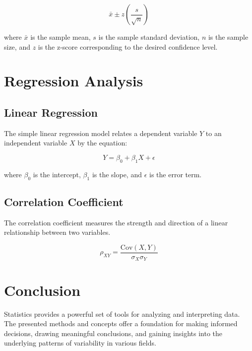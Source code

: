 \documentclass{article}
\begin{document}
\begin{equation}
    \bar{x} \pm z \left(\frac{s}{\sqrt{n}}\right)
\end{equation}

where $\bar{x}$ is the sample mean, $s$ is the sample standard deviation, $n$ is the sample size, and $z$ is the z-score corresponding to the desired confidence level.

\section{Regression Analysis}

\subsection{Linear Regression}

The simple linear regression model relates a dependent variable $Y$ to an independent variable $X$ by the equation:

\begin{equation}
    Y = \beta_0 + \beta_1 X + \epsilon
\end{equation}

where $\beta_0$ is the intercept, $\beta_1$ is the slope, and $\epsilon$ is the error term.

\subsection{Correlation Coefficient}

The correlation coefficient measures the strength and direction of a linear relationship between two variables.

\begin{equation}
    \rho_{XY} = \frac{\text{Cov}(X, Y)}{\sigma_X \sigma_Y}
\end{equation}

\section{Conclusion}

Statistics provides a powerful set of tools for analyzing and interpreting data. The presented methods and concepts offer a foundation for making informed decisions, drawing meaningful conclusions, and gaining insights into the underlying patterns of variability in various fields.
\end{document}
